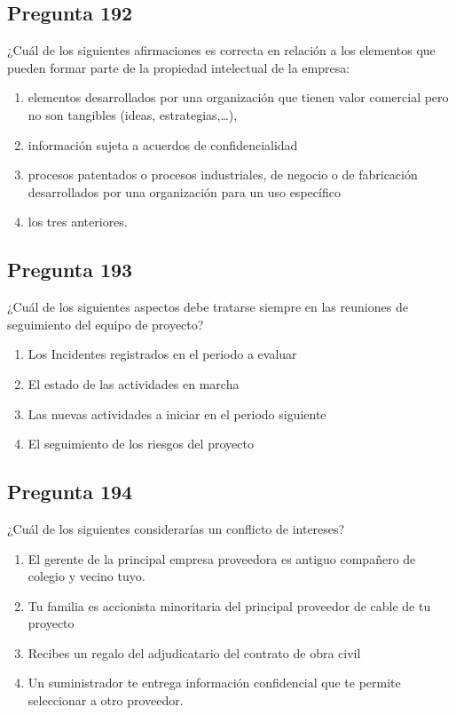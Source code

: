 \documentclass[11pt,a4paper]{article}
\begin{document}
\subsection*{Pregunta 192}
¿Cuál de los siguientes afirmaciones es correcta en relación a los elementos que pueden formar parte de la propiedad intelectual de la empresa:

\begin{enumerate}[label=\alph*)]
  \item elementos desarrollados por una organización que tienen valor comercial pero no son tangibles (ideas, estrategias,…),
  \item información sujeta a acuerdos de confidencialidad
  \item procesos patentados o procesos industriales, de negocio o de fabricación desarrollados por una organización para un uso específico
  \item los tres anteriores.
\end{enumerate}

\subsection*{Pregunta 193}
¿Cuál de los siguientes aspectos debe tratarse siempre en las reuniones de seguimiento del equipo de proyecto?

\begin{enumerate}[label=\alph*)]
  \item Los Incidentes registrados en el periodo a evaluar
  \item El estado de las actividades en marcha
  \item Las nuevas actividades a iniciar en el periodo siguiente
  \item El seguimiento de los riesgos del proyecto
\end{enumerate}

\subsection*{Pregunta 194}
¿Cuál de los siguientes considerarías un conflicto de intereses?

\begin{enumerate}[label=\alph*)]
  \item El gerente de la principal empresa proveedora es antiguo compañero de colegio y vecino tuyo.
  \item Tu familia es accionista minoritaria del principal proveedor de cable de tu proyecto
  \item Recibes un regalo del adjudicatario del contrato de obra civil
  \item Un suministrador te entrega información confidencial que te permite seleccionar a otro proveedor.
\end{enumerate}
\end{document}
